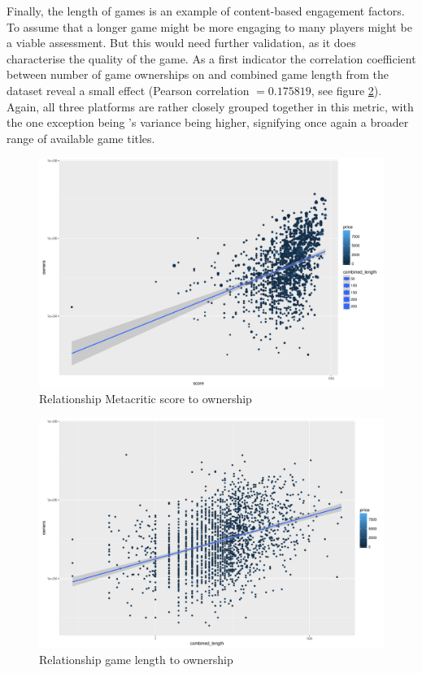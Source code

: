 Finally, the length of games is an example of content-based engagement factors. To assume that a longer game might be more engaging to many players might be a viable assessment. But this would need further validation, as it does characterise the quality of the game. As a first indicator the correlation coefficient between number of game ownerships on \steam and combined game length from the \hltb dataset reveal a small effect (Pearson correlation $= 0.175819$, see figure \ref{fig:rel-combinedlength-owners}). Again, all three platforms are rather closely grouped together in this metric, with the one exception being \steam's variance being higher, signifying once again a broader range of available game titles.

\begin{figure}[!t]
	\centering
	\includegraphics[width=1.0\columnwidth]{images/rel-score-owners.pdf}
	\caption{Relationship Metacritic score to ownership}
\label{fig:rel-score-owners}
\end{figure}

\begin{figure}[!t]
	\centering
	\includegraphics[width=1.0\columnwidth]{images/rel-combinedlength-owners.pdf}
	\caption{Relationship game length to ownership}
\label{fig:rel-combinedlength-owners}
\end{figure}


